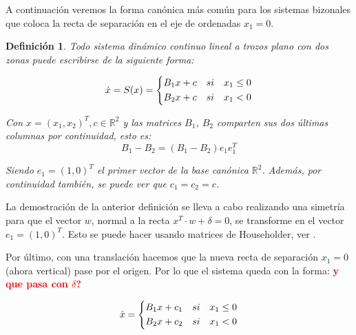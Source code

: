 \documentclass[12pt,a4paper]{report} %
\newtheorem{definicion}{Definición}[chapter] %
\begin{document}
	 \noindent A continuación veremos la forma canónica más común para los sistemas bizonales que coloca la recta de separación en el eje de ordenadas $x_1=0$.
	
	\begin{definicion}
		Todo sistema dinámico continuo lineal a trozos plano con dos zonas puede escribirse de la siguiente forma:
	
	\begin{equation}
		\dot{x}=S(x)=
		\label{eq:lien}
		\scalebox{1}{$\displaystyle
			\left\{
			\begin{aligned}
				B_1x+c\quad si \quad x_1 \leq 0 \\
				B_2x+c\quad si \quad x_1 < 0
			\end{aligned}
			\right.
			$}
	\end{equation}\smallskip
	
	\noindent Con $x=(x_1,x_2)^T, c\in \mathbb{R}^2$ y las matrices $B_1$, $B_2$ comparten sus dos últimas columnas por continuidad, esto es:
	\begin{equation}
		B_1-B_2 = \left(B_1-B_2\right)e_1e_1^T 
	\end{equation}\smallskip
	
	\noindent Siendo $e_1=(1,0)^T$ el primer vector de la base canónica $\mathbb{R}^2$. Además, por continuidad también, se puede ver que $c_1=c_2=c$.
    \end{definicion}\smallskip

\newpage

	\noindent La demostración de la anterior definición se lleva a cabo realizando una simetría para que el vector $w$, normal a la recta $x^T\cdotp w+\delta=0$, se transforme en el vector $e_1=(1,0)^T$. Esto se puede hacer usando matrices de Householder, ver \cite{docvic}.
	
	\vspace{0.5cm}\noindent Por último, con una translación hacemos que la nueva recta de separación $x_1=0$ (ahora vertical) pase por el origen. Por lo que el sistema queda con la forma:
	\textbf{\textcolor{red}{y que pasa con $\delta$?}}
	
	\begin{equation}
		\dot{x}=
		\label{eq:lien2}
		\scalebox{1}{$\displaystyle
			\left\{
			\begin{aligned}
			B_1x+c_1\quad si \quad x_1 \leq 0 \\
			B_2x+c_2\quad si \quad x_1 < 0
			\end{aligned}
			\right.
			$}
	\end{equation}\smallskip
	
\end{document}
